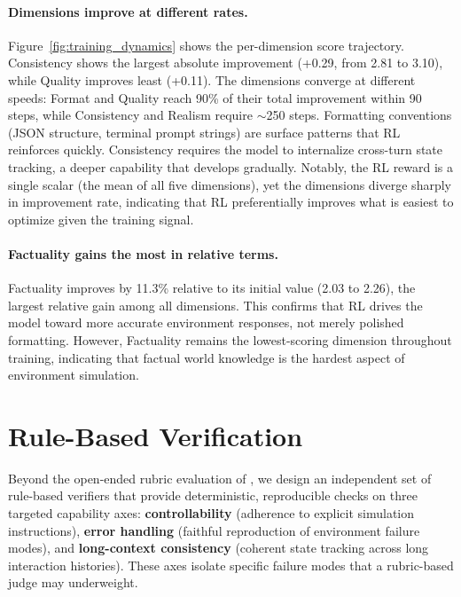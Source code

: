 \paragraph{Dimensions improve at different rates.}
Figure~\ref{fig:training_dynamics} shows the per-dimension score trajectory.
Consistency shows the largest absolute improvement (+0.29, from 2.81 to 3.10), while Quality improves least (+0.11).
The dimensions converge at different speeds: Format and Quality reach 90\% of their total improvement within 90 steps, while Consistency and Realism require $\sim$250 steps.
Formatting conventions (JSON structure, terminal prompt strings) are surface patterns that RL reinforces quickly. Consistency requires the model to internalize cross-turn state tracking, a deeper capability that develops gradually.
Notably, the RL reward is a single scalar (the mean of all five dimensions), yet the dimensions diverge sharply in improvement rate, indicating that RL preferentially improves what is easiest to optimize given the training signal.

\paragraph{Factuality gains the most in relative terms.}
Factuality improves by 11.3\% relative to its initial value (2.03 to 2.26), the largest relative gain among all dimensions.
This confirms that RL drives the model toward more accurate environment responses, not merely polished formatting.
However, Factuality remains the lowest-scoring dimension throughout training, indicating that factual world knowledge is the hardest aspect of environment simulation.


\section{Rule-Based Verification}
\label{sec:appendix:rulebased}

Beyond the open-ended rubric evaluation of \bench, we design an independent set of rule-based verifiers that provide deterministic, reproducible checks on three targeted capability axes: \textbf{controllability} (adherence to explicit simulation instructions), \textbf{error handling} (faithful reproduction of environment failure modes), and \textbf{long-context consistency} (coherent state tracking across long interaction histories).
These axes isolate specific failure modes that a rubric-based judge may underweight.

